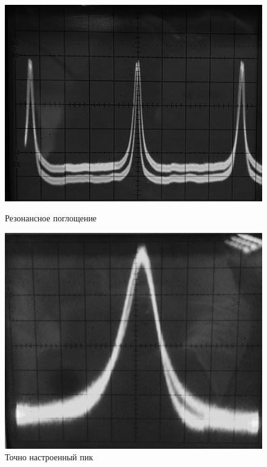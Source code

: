 \documentclass[a4paper,12pt]{article}
\theoremstyle{plain} %
\theoremstyle{definition} %
\theoremstyle{remark} %
\begin{document}
    \begin{figure}[h!]
			\begin{center}
				\begin{minipage}{0.49\linewidth}
					\includegraphics[width=\linewidth]{oscilloscope.jpg}
					\caption{Резонансное поглощение}
				\end{minipage}
				\hfill
				\begin{minipage}{0.49\linewidth}
					\includegraphics[width=\linewidth]{second.jpg}
				\end{minipage}
			\end{center}
			\caption{Точно настроенный пик}
		\end{figure}
\end{document}
